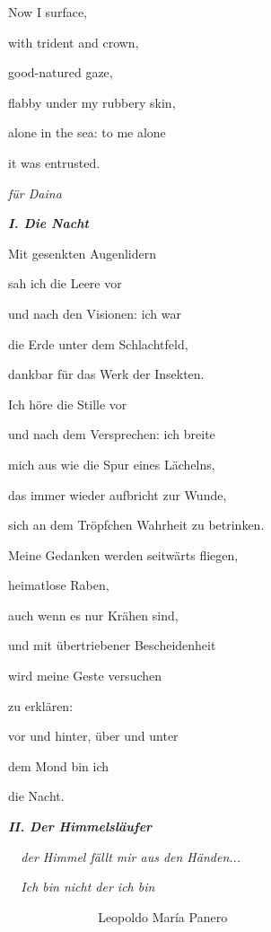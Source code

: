 Now I surface,

with trident and crown,

good-natured gaze,

flabby under my rubbery skin,

alone in the sea: to me alone

it was entrusted.


\bigskip


\bigskip


\emph{
für Daina }


\bigskip

{\bfseries\itshape
I. Die Nacht}


\bigskip

Mit gesenkten Augenlidern 

sah ich die Leere vor

und nach den Visionen: ich war

die Erde unter dem Schlachtfeld,

dankbar für das Werk der Insekten.


\bigskip

Ich höre die Stille vor

und nach dem Versprechen: ich breite

mich aus wie die Spur eines Lächelns,

das immer wieder aufbricht zur Wunde,

sich an dem Tröpfchen Wahrheit zu betrinken.


\bigskip

Meine Gedanken werden seitwärts fliegen, 

heimatlose Raben,

auch wenn es nur Krähen sind,

und mit übertriebener Bescheidenheit

wird meine Geste versuchen

zu erklären:

vor und hinter, über und unter

dem Mond bin ich

die Nacht.


\bigskip

{\bfseries\itshape
II. Der Himmelsläufer}


\bigskip

\emph{
\ \ der Himmel fällt mir aus den Händen...}

\emph{
\ \ Ich bin nicht der ich bin}

\emph{\ \  \ \ \ \ \ \ \ \ \ \ \ \ }Leopoldo María Panero


